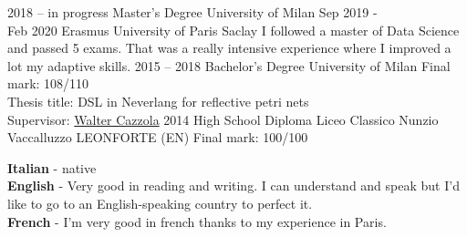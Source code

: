 \documentclass[9pt]{developercv} %
\begin{document}


\begin{entrylist}
	\entry
		{2018 -- in progress}
		{Master's Degree}
		{University of Milan}
		{}
	\entry
		{Sep 2019 - \\Feb 2020}
		{Erasmus}
		{University of Paris Saclay}
		{
			I followed a master of Data Science and passed 5 exams.
			That was a really intensive experience where I improved a lot my adaptive skills. 
		}
	\entry
		{2015 -- 2018}
		{Bachelor's Degree}
		{University of Milan}
		{
			Final mark: 108/110\\
			Thesis title: DSL in Neverlang for reflective petri nets\\
			Supervisor: \href{https://cazzola.di.unimi.it}{Walter Cazzola}
		}
	\entry
		{2014}
		{High School Diploma}
		{Liceo Classico Nunzio Vaccalluzzo LEONFORTE (EN)}
		{
			Final mark: 100/100\\
		}
\end{entrylist}


\begin{minipage}[t]{0.5\textwidth}
	\vspace{-\baselineskip} %

	
	\textbf{Italian} - native\\
	\textbf{English} - Very good in reading and writing. I can understand and speak but I'd like to go to an English-speaking country to perfect it.\\
	\textbf{French} - I'm very good in french thanks to my experience in Paris.
\end{minipage}
\hfill
\begin{minipage}[t]{0.3\textwidth}
	\vspace{-\baselineskip} %
	

\end{minipage}


\end{document}
